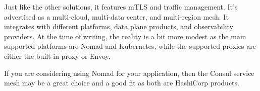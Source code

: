 Just like the other solutions, it features mTLS and traffic management. It's advertised as a multi-cloud, multi-data center, and multi-region mesh. It integrates with different platforms, data plane products, and observability providers. At the time of writing, the reality is a bit more modest as the main supported platforms are Nomad and Kubernetes, while the supported proxies are either the built-in proxy or Envoy.

If you are considering using Nomad for your application, then the Consul service mesh may be a great choice and a good fit as both are HashiCorp products.






















